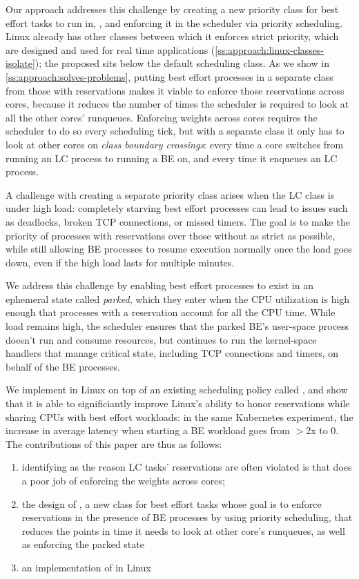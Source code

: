 Our approach addresses this challenge by creating a new priority class for best
effort tasks to run in, \beclass{}, and enforcing it in the scheduler via
priority scheduling. Linux already has other classes between which it enforces
strict priority, which are designed and used for real time applications
(\autoref{ss:approach:linux-classes-isolate}); the proposed \beclass{} sits
below the default scheduling class. As we show in
\autoref{ss:approach:solves-problems}, putting best effort processes in a
separate class from those with reservations makes it viable to enforce those
reservations across cores, because it reduces the number of times the scheduler
is required to look at all the other cores' runqueues. Enforcing weights across
cores requires the scheduler to do so every scheduling tick, but with a separate
class it only has to look at other cores on \textit{class boundary crossings}:
every time a core switches from running an LC process to running a BE on, and
every time it enqueues an LC process.

A challenge with creating a separate priority class arises when the LC class is
under high load: completely starving best effort processes can lead to issues
such as deadlocks, broken TCP connections, or missed timers. The goal is to make
the priority of processes with reservations over those without as strict as
possible, while still allowing BE processes to resume execution normally once
the load goes down, even if the high load lasts for multiple minutes.

We address this challenge by enabling best effort processes to exist in an
ephemeral state called \textit{parked}, which they enter when the CPU
utilization is high enough that processes with a reservation account for all the
CPU time. While load remains high, the scheduler ensures that the parked BE's
user-space process doesn't run and consume resources, but continues to run the
kernel-space handlers that manage critical state, including TCP connections and
timers, on behalf of the BE processes. 

We implement \beclass{} in Linux on top of an existing scheduling policy called
\schedidle{}, and show that it is able to significiantly improve Linux's ability
to honor reservations while sharing CPUs with best effort workloads: in the same
Kubernetes experiment, the increase in average latency when starting a BE
workload goes from $>$2x to 0. The contributions of this paper are thus as
follows: 
\begin{enumerate}
    \item identifying as the reason LC tasks' reservations are often violated is
    that \cgroups{} does a poor job of enforcing the weights across cores;
    \item the design of \beclass{}, a new class for best effort tasks whose goal
    is to enforce reservations in the presence of BE processes by using priority
    scheduling, that reduces the points in time it needs to look at other core's
    runqueues, as well as enforcing the parked state
    \item an implementation of \beclass{} in Linux
\end{enumerate}
